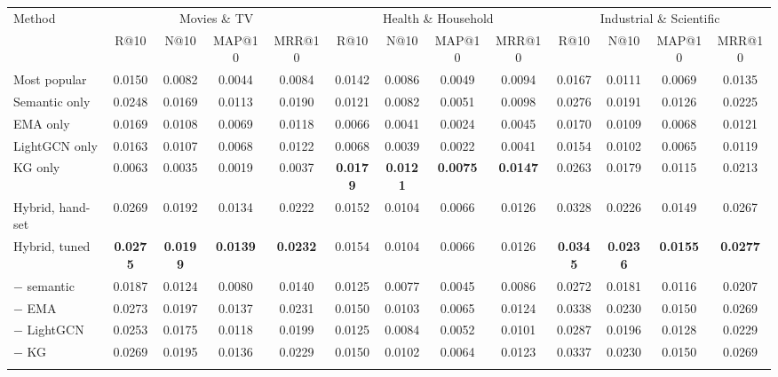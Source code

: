 \setlength{\tabcolsep}{3pt}
\begin{tabular*}{\hsize}{@{\extracolsep{\fill}}lcccccccccccc@{}}
\toprule
Method & \multicolumn{4}{c}{Movies \& TV} & \multicolumn{4}{c}{Health \& Household} & \multicolumn{4}{c}{Industrial \& Scientific} \\
 & R@10 & N@10 & MAP@10 & MRR@10 & R@10 & N@10 & MAP@10 & MRR@10 & R@10 & N@10 & MAP@10 & MRR@10 \\
\colrule
Most popular & 0.0150 & 0.0082 & 0.0044 & 0.0084 & 0.0142 & 0.0086 & 0.0049 & 0.0094 & 0.0167 & 0.0111 & 0.0069 & 0.0135 \\
Semantic only & 0.0248 & 0.0169 & 0.0113 & 0.0190 & 0.0121 & 0.0082 & 0.0051 & 0.0098 & 0.0276 & 0.0191 & 0.0126 & 0.0225 \\
EMA only & 0.0169 & 0.0108 & 0.0069 & 0.0118 & 0.0066 & 0.0041 & 0.0024 & 0.0045 & 0.0170 & 0.0109 & 0.0068 & 0.0121 \\
LightGCN only & 0.0163 & 0.0107 & 0.0068 & 0.0122 & 0.0068 & 0.0039 & 0.0022 & 0.0041 & 0.0154 & 0.0102 & 0.0065 & 0.0119 \\
KG only & 0.0063 & 0.0035 & 0.0019 & 0.0037 & \textbf{0.0179} & \textbf{0.0121} & \textbf{0.0075} & \textbf{0.0147} & 0.0263 & 0.0179 & 0.0115 & 0.0213 \\
\colrule
Hybrid, hand-set & 0.0269 & 0.0192 & 0.0134 & 0.0222 & 0.0152 & 0.0104 & 0.0066 & 0.0126 & 0.0328 & 0.0226 & 0.0149 & 0.0267 \\
Hybrid, tuned & \textbf{0.0275} & \textbf{0.0199} & \textbf{0.0139} & \textbf{0.0232} & 0.0154 & 0.0104 & 0.0066 & 0.0126 & \textbf{0.0345} & \textbf{0.0236} & \textbf{0.0155} & \textbf{0.0277} \\
\colrule
\quad $-$ semantic & 0.0187 & 0.0124 & 0.0080 & 0.0140 & 0.0125 & 0.0077 & 0.0045 & 0.0086 & 0.0272 & 0.0181 & 0.0116 & 0.0207 \\
\quad $-$ EMA & 0.0273 & 0.0197 & 0.0137 & 0.0231 & 0.0150 & 0.0103 & 0.0065 & 0.0124 & 0.0338 & 0.0230 & 0.0150 & 0.0269 \\
\quad $-$ LightGCN & 0.0253 & 0.0175 & 0.0118 & 0.0199 & 0.0125 & 0.0084 & 0.0052 & 0.0101 & 0.0287 & 0.0196 & 0.0128 & 0.0229 \\
\quad $-$ KG & 0.0269 & 0.0195 & 0.0136 & 0.0229 & 0.0150 & 0.0102 & 0.0064 & 0.0123 & 0.0337 & 0.0230 & 0.0150 & 0.0269 \\
\botrule
\end{tabular*}
